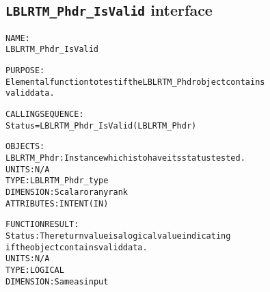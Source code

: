 \subsection{\texttt{LBLRTM\_Phdr\_IsValid} interface}
  \label{sec:LBLRTM_Phdr_IsValid_interface}
  \begin{alltt}
 
  NAME:
        LBLRTM_Phdr_IsValid
 
  PURPOSE:
        Elemental function to test if the LBLRTM_Phdr object contains
        valid data.
 
  CALLING SEQUENCE:
        Status = LBLRTM_Phdr_IsValid( LBLRTM_Phdr )
 
  OBJECTS:
        LBLRTM_Phdr:   Instance which is to have its status tested.
                       UNITS:      N/A
                       TYPE:       LBLRTM_Phdr_type
                       DIMENSION:  Scalar or any rank
                       ATTRIBUTES: INTENT(IN)
 
  FUNCTION RESULT:
        Status:        The return value is a logical value indicating
                       if the object contains valid data.
                       UNITS:      N/A
                       TYPE:       LOGICAL
                       DIMENSION:  Same as input
 
  \end{alltt}
